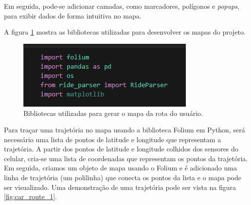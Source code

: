     Em seguida, pode-se adicionar camadas, como marcadores, polígonos e \textit{popups}, para exibir dados de forma intuitiva no mapa. 
    
    
    A figura 
    \ref{fig:python_libs} mostra as bibliotecas utilizadas para desenvolver os mapas do projeto.
    
    \begin{figure}[hp]
        \centering
        
        \includegraphics[scale=0.8]{figures/bibliotecas.jpg}
        
        \caption{Bibliotecas utilizadas para gerar o mapa da rota do usuário.}
        
        \label{fig:python_libs}
    \end{figure}
    
            
    Para traçar uma trajetória no mapa usando a biblioteca Folium em Python, será necessário uma lista de pontos de latitude e longitude que representam a trajetória. A partir dos pontos de latitude e longitude colhidos dos sensores do celular, cria-se uma lista de coordenadas que representam os pontos da trajetória. Em seguida, criamos um objeto de mapa usando o Folium e é adicionado uma linha de trajetória (um polilinha) que conecta os pontos da lista e o mapa pode ser visualizado. Uma demonstração de uma trajetória pode ser vista na figura \ref{fig:car_route_1}.
    
